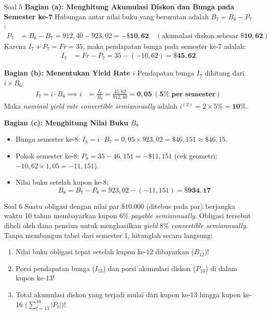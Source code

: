\documentclass[11pt,a4paper]{article}
\begin{document}
\begin{solutionbox}{Soal 5}
\textbf{Bagian (a): Menghitung Akumulasi Diskon dan Bunga pada Semester ke-7}
Hubungan antar nilai buku yang berurutan adalah $B_7 = B_6 - P_7$:
\begin{align*}
    P_7 &= B_6 - B_7 = 912{,}40 - 923{,}02 = \mathbf{-\$10{,}62} \quad (\text{akumulasi diskon sebesar } \mathbf{\$10{,}62})
\end{align*}
Karena $I_7 + P_7 = Fr = 35$, maka pendapatan bunga pada semester ke-7 adalah:
\begin{align*}
    I_7 &= Fr - P_7 = 35 - (-10{,}62) = \mathbf{\$45{,}62}
\end{align*}

\textbf{Bagian (b): Menentukan Yield Rate $i$}
Pendapatan bunga $I_7$ dihitung dari $i \times B_6$:
\begin{align*}
    I_7 = i \cdot B_6 \implies i &= \frac{I_7}{B_6} = \frac{45{,}62}{912{,}40} = \mathbf{0{,}05 \ (5\% \text{ per semester})}
\end{align*}
Maka \textit{nominal yield rate convertible semiannually} adalah $i^{(2)} = 2 \times 5\% = \mathbf{10\%}$.

\textbf{Bagian (c): Menghitung Nilai Buku $B_8$}
\begin{itemize}
    \item Bunga semester ke-8: $I_8 = i \cdot B_7 = 0{,}05 \times 923{,}02 = \$46{,}151 \approx \$46{,}15$.
    \item Pokok semester ke-8: $P_8 = 35 - 46{,}151 = -\$11{,}151$ (cek geometri: $-10{,}62 \times 1{,}05 = -11{,}151$).
    \item Nilai buku setelah kupon ke-8:
    \begin{equation*}
        B_8 = B_7 - P_8 = 923{,}02 - (-11{,}151) = \mathbf{\$934{,}17}
    \end{equation*}
\end{itemize}
\end{solutionbox}

\vspace{1.2em}

\begin{problembox}{Soal 6}
Suatu obligasi dengan nilai par $\$10.000$ (ditebus pada par) berjangka waktu 10 tahun membayarkan kupon $6\%$ \textit{payable semiannually}. Obligasi tersebut dibeli oleh dana pensiun untuk menghasilkan \textit{yield} $8\%$ \textit{convertible semiannually}. Tanpa membangun tabel dari semester 1, hitunglah secara langsung:
\begin{enumerate}[label=(\alph*)]
    \item Nilai buku obligasi tepat setelah kupon ke-12 dibayarkan ($B_{12}$)!
    \item Porsi pendapatan bunga ($I_{13}$) dan porsi akumulasi diskon ($P_{13}$) di dalam kupon ke-13!
    \item Total akumulasi diskon yang terjadi mulai dari kupon ke-13 hingga kupon ke-16 ($\sum_{t=13}^{16} |P_t|$)!
\end{enumerate}
\end{problembox}
\end{document}
